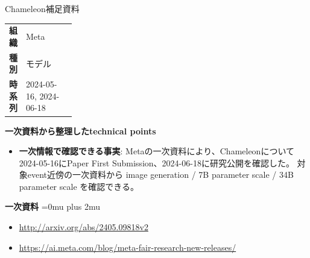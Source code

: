 \begin{technicalnote}{Chameleon}{補足資料}
\begingroup
\begin{tabularx}{\linewidth}{@{}>{\bfseries}p{0.22\linewidth}X@{}}
組織 & Meta \\
種別 & モデル \\
時系列 & 2024-05-16, 2024-06-18 \\
\end{tabularx}
\smallskip
\begin{minipage}{\linewidth}
{\bfseries 一次資料から整理したtechnical points}
\begin{itemize}[leftmargin=1.5em,itemsep=0.35em]
\item \textbf{一次情報で確認できる事実}: Metaの一次資料により、Chameleonについて2024-05-16にPaper First Submission、2024-06-18に研究公開を確認した。 対象event近傍の一次資料から image generation / 7B parameter scale / 34B parameter scale を確認できる。
\end{itemize}
\begin{minipage}{\linewidth}
\begin{samepage}
{\bfseries 一次資料}
\begingroup\sloppy
\Urlmuskip=0mu plus 2mu\relax
\begin{itemize}[leftmargin=1.5em,itemsep=0.25em]
\item {\scriptsize\url{http://arxiv.org/abs/2405.09818v2}}
\item {\scriptsize\url{https://ai.meta.com/blog/meta-fair-research-new-releases/}}
\end{itemize}
\endgroup
\end{samepage}
\end{minipage}
\end{minipage}
\endgroup
\end{technicalnote}
\medskip
